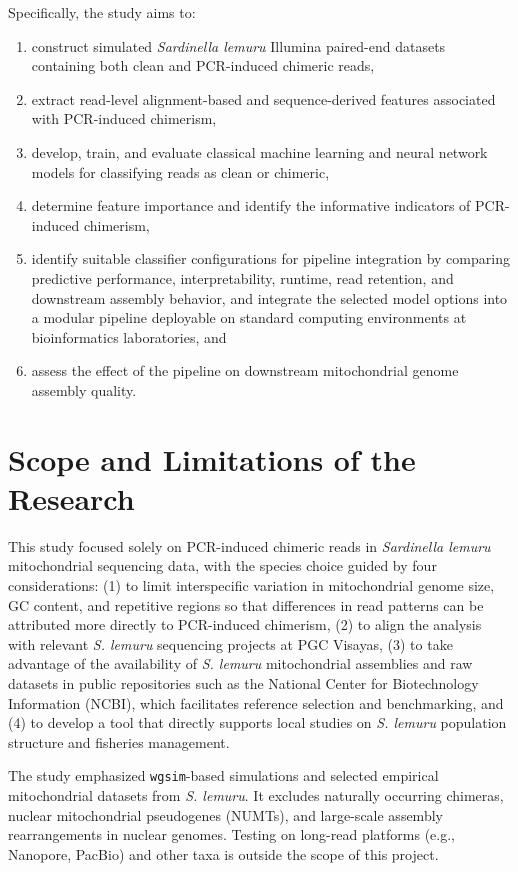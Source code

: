 Specifically, the study aims to:
\begin{enumerate}
  \item construct simulated \textit{Sardinella lemuru} Illumina paired-end datasets containing both clean and PCR-induced chimeric reads,
  \item extract read-level alignment-based and sequence-derived features associated with PCR-induced chimerism,
  \item develop, train, and evaluate classical machine learning and neural network models for classifying reads as clean or chimeric,
  \item determine feature importance and identify the informative indicators of PCR-induced chimerism,
  \item identify suitable classifier configurations for pipeline integration by comparing predictive performance, interpretability, runtime, read retention, and downstream assembly behavior, and integrate the selected model options into a modular pipeline deployable on standard computing environments at bioinformatics laboratories, and
  \item assess the effect of the pipeline on downstream mitochondrial genome assembly quality.
\end{enumerate}

\section{Scope and Limitations of the Research}
\label{sec:scopelimitations}

This study focused solely on PCR-induced chimeric reads in \textit{Sardinella lemuru} mitochondrial sequencing data, with the species choice guided by four considerations: (1) to limit interspecific variation in mitochondrial genome size, GC content, and repetitive regions so that differences in read patterns can be attributed more directly to PCR-induced chimerism, (2) to align the analysis with relevant \textit{S. lemuru} sequencing projects at PGC Visayas, (3) to take advantage of the availability of \textit{S. lemuru} mitochondrial assemblies and raw datasets in public repositories such as the National Center for Biotechnology Information (NCBI), which facilitates reference selection and benchmarking, and (4) to develop a tool that directly supports local studies on \textit{S. lemuru} population structure and fisheries management.

The study emphasized \texttt{wgsim}-based simulations and selected empirical mitochondrial datasets from \textit{S. lemuru}. It excludes naturally occurring chimeras, nuclear mitochondrial pseudogenes (NUMTs), and large-scale assembly rearrangements in nuclear genomes. Testing on long-read platforms (e.g., Nanopore, PacBio) and other taxa is outside the scope of this project.

